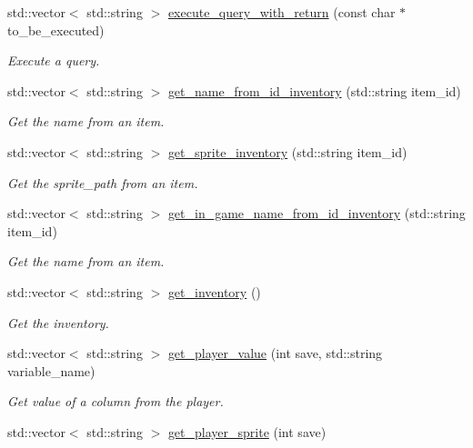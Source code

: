 \begin{DoxyCompactItemize}
std\+::vector$<$ std\+::string $>$ \hyperlink{classsql_a53dd323de395c13534e63a3482190777}{execute\+\_\+query\+\_\+with\+\_\+return} (const char $\ast$to\+\_\+be\+\_\+executed)
\begin{DoxyCompactList}\small\item\em Execute a query. \end{DoxyCompactList}\item 
std\+::vector$<$ std\+::string $>$ \hyperlink{classsql_a7b49bcf5ac10f6421a5ecd62865e3316}{get\+\_\+name\+\_\+from\+\_\+id\+\_\+inventory} (std\+::string item\+\_\+id)
\begin{DoxyCompactList}\small\item\em Get the name from an item. \end{DoxyCompactList}\item 
std\+::vector$<$ std\+::string $>$ \hyperlink{classsql_a060764a845c3a26c99c6f15470df9634}{get\+\_\+sprite\+\_\+inventory} (std\+::string item\+\_\+id)
\begin{DoxyCompactList}\small\item\em Get the sprite\+\_\+path from an item. \end{DoxyCompactList}\item 
std\+::vector$<$ std\+::string $>$ \hyperlink{classsql_a62cd4910a9310621ca22fb3c322f52a4}{get\+\_\+in\+\_\+game\+\_\+name\+\_\+from\+\_\+id\+\_\+inventory} (std\+::string item\+\_\+id)
\begin{DoxyCompactList}\small\item\em Get the name from an item. \end{DoxyCompactList}\item 
std\+::vector$<$ std\+::string $>$ \hyperlink{classsql_a7f818b967453b1ae15ce4c5b28cf4765}{get\+\_\+inventory} ()
\begin{DoxyCompactList}\small\item\em Get the inventory. \end{DoxyCompactList}\item 
std\+::vector$<$ std\+::string $>$ \hyperlink{classsql_ae560c01f2e8e57cee454ecd8e38616eb}{get\+\_\+player\+\_\+value} (int save, std\+::string variable\+\_\+name)
\begin{DoxyCompactList}\small\item\em Get value of a column from the player. \end{DoxyCompactList}\item 
std\+::vector$<$ std\+::string $>$ \hyperlink{classsql_a370d018617316ff6489cbb97565b7af9}{get\+\_\+player\+\_\+sprite} (int save)

\end{DoxyCompactItemize}
